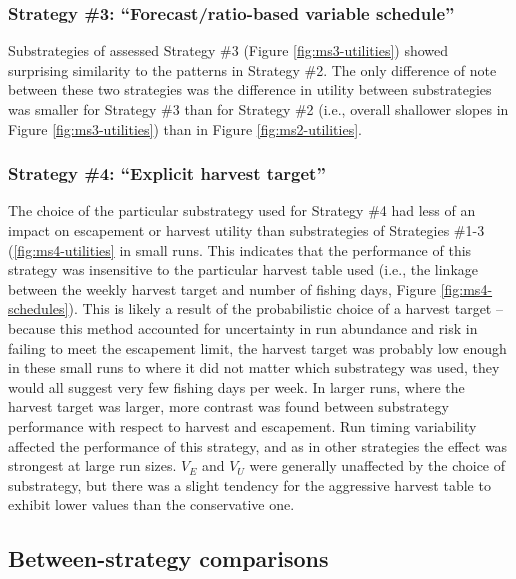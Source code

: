 \documentclass[12pt,]{book}
\theoremstyle{definition}
\theoremstyle{definition}
\theoremstyle{definition}
\theoremstyle{remark}
\begin{document}
\subsubsection{\texorpdfstring{Strategy \#3: ``Forecast/ratio-based
variable
schedule''}{Strategy \#3: Forecast/ratio-based variable schedule}}\label{strategy-3-forecastratio-based-variable-schedule-1}

\noindent
Substrategies of assessed Strategy \#3 (Figure \ref{fig:ms3-utilities})
showed surprising similarity to the patterns in Strategy \#2. The only
difference of note between these two strategies was the difference in
utility between substrategies was smaller for Strategy \#3 than for
Strategy \#2 (i.e., overall shallower slopes in Figure
\ref{fig:ms3-utilities}) than in Figure \ref{fig:ms2-utilities}.

\subsubsection{\texorpdfstring{Strategy \#4: ``Explicit harvest
target''}{Strategy \#4: Explicit harvest target}}\label{strategy-4-explicit-harvest-target-1}

\noindent
The choice of the particular substrategy used for Strategy \#4 had less
of an impact on escapement or harvest utility than substrategies of
Strategies \#1-3 (\ref{fig:ms4-utilities} in small runs. This indicates
that the performance of this strategy was insensitive to the particular
harvest table used (i.e., the linkage between the weekly harvest target
and number of fishing days, Figure \ref{fig:ms4-schedules}). This is
likely a result of the probabilistic choice of a harvest target --
because this method accounted for uncertainty in run abundance and risk
in failing to meet the escapement limit, the harvest target was probably
low enough in these small runs to where it did not matter which
substrategy was used, they would all suggest very few fishing days per
week. In larger runs, where the harvest target was larger, more contrast
was found between substrategy performance with respect to harvest and
escapement. Run timing variability affected the performance of this
strategy, and as in other strategies the effect was strongest at large
run sizes. \(V_E\) and \(V_U\) were generally unaffected by the choice
of substrategy, but there was a slight tendency for the aggressive
harvest table to exhibit lower values than the conservative one.

\subsection{Between-strategy
comparisons}\label{between-strategy-comparisons-1}
\end{document}

